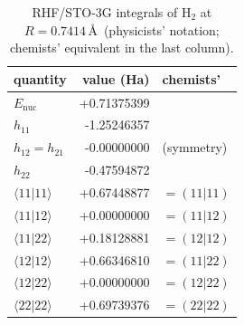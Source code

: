 \begin{table}[H]
\centering\small
\begin{tabular}{lrl}
\toprule
quantity & value (Ha) & chemists' \\
\midrule
$E_\mathrm{nuc}$ & +0.71375399 & \\
$h_{11}$ & -1.25246357 & \\
$h_{12}=h_{21}$ & -0.00000000 & (symmetry) \\
$h_{22}$ & -0.47594872 & \\
$\langle 11\vert 11\rangle$ & +0.67448877 & $= (11|11)$ \\
$\langle 11\vert 12\rangle$ & +0.00000000 & $= (11|12)$ \\
$\langle 11\vert 22\rangle$ & +0.18128881 & $= (12|12)$ \\
$\langle 12\vert 12\rangle$ & +0.66346810 & $= (11|22)$ \\
$\langle 12\vert 22\rangle$ & +0.00000000 & $= (12|22)$ \\
$\langle 22\vert 22\rangle$ & +0.69739376 & $= (22|22)$ \\
\bottomrule
\end{tabular}
\caption{RHF/STO-3G integrals of H$_2$ at $R=0.7414$\,\AA\ (physicists' notation; chemists' equivalent in the last column).}
\end{table}
